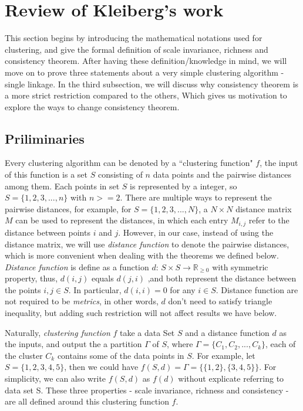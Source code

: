 \documentclass{uonmathreport}
\begin{document}
\section{Review of Kleiberg's work} \label{sec:background}
This section begins by introducing the mathematical notations used for clustering, and give the formal definition of scale invariance, richness and consistency theorem. After having these definition/knowledge in mind, we will move on to prove three statements about a very simple clustering algorithm - single linkage. In the third subsection, we will discuss why consistency theorem  is a more strict restriction compared to the others, Which gives us motivation to explore the ways to change consistency theorem.
\subsection{Priliminaries} \label{subsec:priliminaries}
Every clustering algorithm can be denoted by a ``clustering function" $f$, the input of this function is a set $S$ consisting of $n$ data points and the pairwise distances among them. Each points in set $S$ is represented by a integer, so $S = \{1,2,3,...,n\}$ with $n>=2 $. There are multiple ways to represent the pairwise distances, for example, for $S = \{1,2,3,...,N\}$, a $N \times N$ distance matrix $M$ can be used to represent the distances, in which each entry $M_{i,j}$ refer to the distance between points $i$ and $j$. However, in our case, instead of using the distance matrix, we will use \textit{distance function} to denote the pairwise distances, which is more convenient when dealing with the theorems we defined below. \textit{Distance function} is define as a function $d$: $S \times S \rightarrow \mathbb{R}_{\ge 0}$ with symmetric property, thus, $d(i,j)$ equals $d(j,i)$ ,and both represent the distance between the points $i,j \in S$. In particular, $d(i,i) = 0$ for any $i\in S$. Distance function are not required to be \textit{metrics}, in other words, $d$ don't need to satisfy triangle inequality, but adding such restriction will not affect results we have below.

Naturally, \textit{clustering function} $f$ take a data Set $S$ and a distance function $d$ as the inputs, and output the a partition $\Gamma$ of $S$, where $\Gamma = \{C_1,C_2,...,C_k\}$, each of the cluster $C_k$ contains some of the data points in $S$. For example, let $S = \{1,2,3,4,5\}$, then we could have $f(S,d)= \Gamma = \{ \{1,2\},\{3,4,5\} \}$. For simplicity, we can also write $f(S,d)$ as $f(d)$ without explicate referring to data set S. These three properties - scale invariance, richness and consistency - are all defined around this clustering function $f$.
\end{document}
